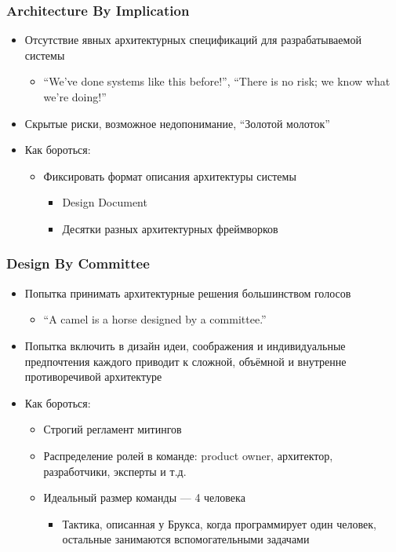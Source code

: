 \documentclass{../../slides-style}
\begin{document}
    \begin{frame}
        \frametitle{Architecture By Implication}
        \begin{itemize}
            \item Отсутствие явных архитектурных спецификаций для разрабатываемой системы
            \begin{itemize}
                \item ``We’ve done systems like this before!'', ``There is no risk; we know what we’re doing!''
            \end{itemize}
            \item Скрытые риски, возможное недопонимание, ``Золотой молоток''
            \item Как бороться:
            \begin{itemize}
                \item Фиксировать формат описания архитектуры системы
                \begin{itemize}
                    \item Design Document
                    \item Десятки разных архитектурных фреймворков
                \end{itemize}
            \end{itemize}
        \end{itemize}
    \end{frame}

    \begin{frame}
        \frametitle{Design By Committee}
        \begin{itemize}
            \item Попытка принимать архитектурные решения большинством голосов
            \begin{itemize}
                \item ``A camel is a horse designed by a committee.''
            \end{itemize}
            \item Попытка включить в дизайн идеи, соображения и индивидуальные предпочтения каждого приводит к сложной, объёмной и внутренне противоречивой архитектуре
            \item Как бороться:
            \begin{itemize}
                \item Строгий регламент митингов
                \item Распределение ролей в команде: product owner, архитектор, разработчики, эксперты и т.д.
                \item Идеальный размер команды --- 4 человека
                \begin{itemize}
                    \item Тактика, описанная у Брукса, когда программирует один человек, остальные занимаются вспомогательными задачами
                \end{itemize}
            \end{itemize}
        \end{itemize}
    \end{frame}
\end{document}

